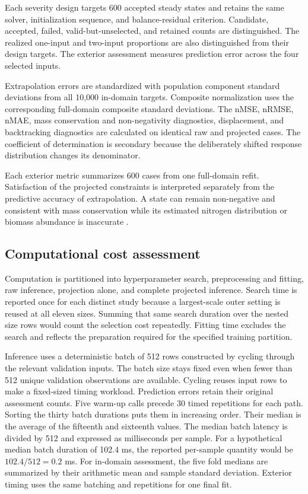 Each severity design targets 600 accepted steady states and retains the same solver, initialization sequence, and balance-residual criterion. Candidate, accepted, failed, valid-but-unselected, and retained counts are distinguished. The realized one-input and two-input proportions are also distinguished from their design targets. The exterior assessment measures prediction error across the four selected inputs.

Extrapolation errors are standardized with population component standard deviations from all 10,000 in-domain targets. Composite normalization uses the corresponding full-domain composite standard deviations. The nMSE, nRMSE, nMAE, mass conservation and non-negativity diagnostics, displacement, and backtracking diagnostics are calculated on identical raw and projected cases. The coefficient of determination is secondary because the deliberately shifted response distribution changes its denominator.

Each exterior metric summarizes 600 cases from one full-domain refit. Satisfaction of the projected constraints is interpreted separately from the predictive accuracy of extrapolation. A state can remain non-negative and consistent with mass conservation while its estimated nitrogen distribution or biomass abundance is inaccurate \citep{Henze2006,Selerio2026}.

\subsection{Computational cost assessment}

Computation is partitioned into hyperparameter search, preprocessing and fitting, raw inference, projection alone, and complete projected inference. Search time is reported once for each distinct study because a largest-scale outer setting is reused at all eleven sizes. Summing that same search duration over the nested size rows would count the selection cost repeatedly. Fitting time excludes the search and reflects the preparation required for the specified training partition.

Inference uses a deterministic batch of 512 rows constructed by cycling through the relevant validation inputs. The batch size stays fixed even when fewer than 512 unique validation observations are available. Cycling reuses input rows to make a fixed-sized timing workload. Prediction errors retain their original assessment counts. Five warm-up calls precede 30 timed repetitions for each path. Sorting the thirty batch durations puts them in increasing order. Their median is the average of the fifteenth and sixteenth values. The median batch latency is divided by 512 and expressed as milliseconds per sample. For a hypothetical median batch duration of 102.4 ms, the reported per-sample quantity would be $102.4/512=0.2$ ms. For in-domain assessment, the five fold medians are summarized by their arithmetic mean and sample standard deviation. Exterior timing uses the same batching and repetitions for one final fit.

